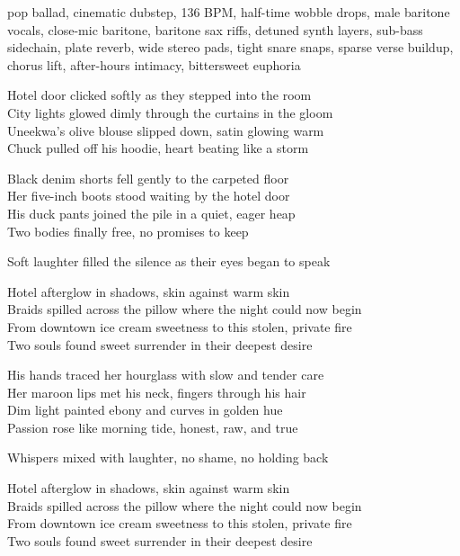 

\begin{notes}
\end{notes}
\begin{style}
pop ballad, cinematic dubstep, 136 BPM, half-time wobble drops, male baritone vocals, close-mic baritone, baritone sax riffs, detuned synth layers, sub-bass sidechain, plate reverb, wide stereo pads, tight snare snaps, sparse verse buildup, chorus lift, after-hours intimacy, bittersweet euphoria
\end{style}
\begin{lyrics}
Hotel door clicked softly as they stepped into the room\\
City lights glowed dimly through the curtains in the gloom\\
Uneekwa’s olive blouse slipped down, satin glowing warm\\
Chuck pulled off his hoodie, heart beating like a storm

Black denim shorts fell gently to the carpeted floor\\
Her five-inch boots stood waiting by the hotel door\\
His duck pants joined the pile in a quiet, eager heap\\
Two bodies finally free, no promises to keep

Soft laughter filled the silence as their eyes began to speak

Hotel afterglow in shadows, skin against warm skin\\
Braids spilled across the pillow where the night could now begin\\
From downtown ice cream sweetness to this stolen, private fire\\
Two souls found sweet surrender in their deepest desire

His hands traced her hourglass with slow and tender care\\
Her maroon lips met his neck, fingers through his hair\\
Dim light painted ebony and curves in golden hue\\
Passion rose like morning tide, honest, raw, and true

Whispers mixed with laughter, no shame, no holding back

Hotel afterglow in shadows, skin against warm skin\\
Braids spilled across the pillow where the night could now begin\\
From downtown ice cream sweetness to this stolen, private fire\\
Two souls found sweet surrender in their deepest desire


\end{lyrics}
